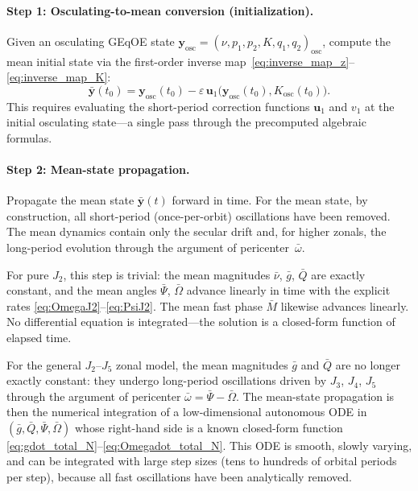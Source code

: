\documentclass[11pt]{article}
\begin{document}


\paragraph{Step 1: Osculating-to-mean conversion (initialization).}
Given an osculating GEqOE state
$\bm{y}_{\mathrm{osc}} = (\nu, p_1, p_2, K, q_1, q_2)_{\mathrm{osc}}$,
compute the mean initial state via the first-order inverse
map~\eqref{eq:inverse_map_z}--\eqref{eq:inverse_map_K}:
\begin{equation}
\bar{\bm{y}}(t_0)
= \bm{y}_{\mathrm{osc}}(t_0)
- \varepsilon\,\bm{u}_1\!\bigl(\bm{y}_{\mathrm{osc}}(t_0),
  K_{\mathrm{osc}}(t_0)\bigr).
\end{equation}
This requires evaluating the short-period correction functions
$\bm{u}_1$ and $v_1$ at the initial osculating state---a single pass
through the precomputed algebraic formulas.

\paragraph{Step 2: Mean-state propagation.}
Propagate the mean state $\bar{\bm{y}}(t)$ forward in time. For the mean
state, by construction, all short-period (once-per-orbit) oscillations have
been removed. The mean dynamics contain only the secular drift and, for
higher zonals, the long-period evolution through the argument of
pericenter~$\bar\omega$.

For pure $J_2$, this step is trivial: the mean magnitudes $\bar\nu$,
$\bar g$, $\bar Q$ are exactly constant, and the mean angles
$\bar\Psi$, $\bar\Omega$ advance linearly in time with the explicit rates
\eqref{eq:OmegaJ2}--\eqref{eq:PsiJ2}. The mean fast phase
$\bar M$ likewise advances linearly. No differential equation is
integrated---the solution is a closed-form function of elapsed time.

For the general $J_2$--$J_5$ zonal model, the mean magnitudes $\bar g$
and $\bar Q$ are no longer exactly constant: they undergo long-period
oscillations driven by $J_3$, $J_4$, $J_5$ through the argument of
pericenter $\bar\omega = \bar\Psi - \bar\Omega$. The mean-state
propagation is then the numerical integration of a low-dimensional autonomous
ODE in $(\bar g, \bar Q, \bar\Psi, \bar\Omega)$ whose right-hand side is
a known closed-form function
\eqref{eq:gdot_total_N}--\eqref{eq:Omegadot_total_N}. This ODE is
smooth, slowly varying, and can be integrated with large step sizes
(tens to hundreds of orbital periods per step), because all fast oscillations
have been analytically removed.
\end{document}
